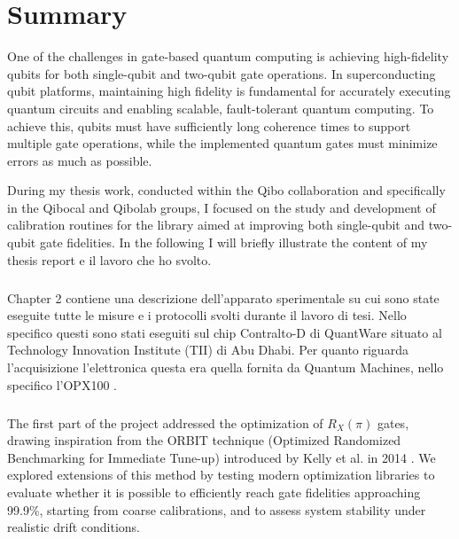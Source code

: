 \chapter*{Summary}
One of the challenges in gate-based quantum computing is achieving high-fidelity qubits for both single-qubit and two-qubit gate operations.
In superconducting qubit platforms, maintaining high fidelity is fundamental for accurately executing quantum circuits and enabling scalable, fault-tolerant quantum computing. 
To achieve this, qubits must have sufficiently long coherence times to support multiple gate operations, while the implemented quantum gates must minimize errors as much as possible.

During my thesis work, conducted within the Qibo collaboration and specifically in the Qibocal and Qibolab groups, I focused on the study and development of calibration routines for the \Qibocal library aimed at improving both single-qubit and two-qubit gate fidelities.
In the following I will briefly illustrate the content of my thesis report e il lavoro che ho svolto.

\paragraph{}


\paragraph{}
Chapter 2 contiene una descrizione dell'apparato sperimentale su cui sono state eseguite tutte le misure e i protocolli svolti durante il lavoro di tesi.
Nello specifico questi sono stati eseguiti sul chip Contralto-D di QuantWare \cite{qw11q} situato al Technology Innovation Institute (TII) di Abu Dhabi. 
Per quanto riguarda l'acquisizione l'elettronica questa era quella fornita da Quantum Machines, nello specifico l'OPX100 \cite{opx1000}.

\paragraph{}
The first part of the project addressed the optimization of $R_X(\pi)$ gates, drawing inspiration from the ORBIT technique (Optimized Randomized Benchmarking for Immediate Tune-up) introduced by Kelly et al. in 2014 \cite{kelly_optimal_2014}. 
We explored extensions of this method by testing modern optimization libraries to evaluate whether it is possible to efficiently reach gate fidelities approaching 99.9\%, starting from coarse calibrations, and to assess system stability under realistic drift conditions.

